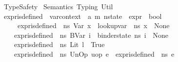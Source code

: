 %
\begin{isabellebody}%
%
%
\isadelimdocument
%
\endisadelimdocument
%
\isatagdocument
%
\isamarkuptrue%
%
\endisatagdocument
{\isafolddocument}%
%
\isadelimdocument
%
\endisadelimdocument
%
\isadelimtheory
%
\endisadelimtheory
%
\isatagtheory
{}\isamarkupfalse%
\ TypeSafety\isanewline
{}\ Semantics\ Typing\ Util\isanewline
{}%
\endisatagtheory
{\isafoldtheory}%
%
\isadelimtheory
\isanewline
%
\endisadelimtheory
\isanewline
{}\isamarkupfalse%
\ expr{\isacharunderscore}{\kern0pt}is{\isacharunderscore}{\kern0pt}defined\ {\isacharcolon}{\kern0pt}{\isacharcolon}{\kern0pt}\ {\isachardoublequoteopen}var{\isacharunderscore}{\kern0pt}context\ {\isasymRightarrow}\ {\isacharparenleft}{\kern0pt}{\isacharprime}{\kern0pt}a{\isacharcomma}{\kern0pt}\ {\isacharprime}{\kern0pt}m{\isacharparenright}{\kern0pt}\ nstate\ {\isasymRightarrow}\ expr\ {\isasymRightarrow}\ bool{\isachardoublequoteclose}\isanewline
\ \ \isanewline
\ \ \ \ \ {\isachardoublequoteopen}expr{\isacharunderscore}{\kern0pt}is{\isacharunderscore}{\kern0pt}defined\ {\isasymLambda}\ ns\ {\isacharparenleft}{\kern0pt}Var\ x{\isacharparenright}{\kern0pt}\ {\isacharequal}{\kern0pt}\ {\isacharparenleft}{\kern0pt}lookup{\isacharunderscore}{\kern0pt}var\ {\isasymLambda}\ ns\ x\ {\isasymnoteq}\ None{\isacharparenright}{\kern0pt}{\isachardoublequoteclose}\isanewline
\ \ \ {\isacharbar}{\kern0pt}\ {\isachardoublequoteopen}expr{\isacharunderscore}{\kern0pt}is{\isacharunderscore}{\kern0pt}defined\ {\isasymLambda}\ ns\ {\isacharparenleft}{\kern0pt}BVar\ i{\isacharparenright}{\kern0pt}\ {\isacharequal}{\kern0pt}\ {\isacharparenleft}{\kern0pt}binder{\isacharunderscore}{\kern0pt}state\ ns\ i\ {\isasymnoteq}\ None{\isacharparenright}{\kern0pt}{\isachardoublequoteclose}\isanewline
\ \ \ {\isacharbar}{\kern0pt}\ {\isachardoublequoteopen}expr{\isacharunderscore}{\kern0pt}is{\isacharunderscore}{\kern0pt}defined\ {\isasymLambda}\ ns\ {\isacharparenleft}{\kern0pt}Lit\ l{\isacharparenright}{\kern0pt}\ {\isacharequal}{\kern0pt}\ True{\isachardoublequoteclose}\isanewline
\ \ \ {\isacharbar}{\kern0pt}\ {\isachardoublequoteopen}expr{\isacharunderscore}{\kern0pt}is{\isacharunderscore}{\kern0pt}defined\ {\isasymLambda}\ ns\ {\isacharparenleft}{\kern0pt}UnOp\ uop\ e{\isacharparenright}{\kern0pt}\ {\isacharequal}{\kern0pt}\ expr{\isacharunderscore}{\kern0pt}is{\isacharunderscore}{\kern0pt}defined\ {\isasymLambda}\ ns\ e{\isachardoublequoteclose}\isanewline

\end{isabellebody}
